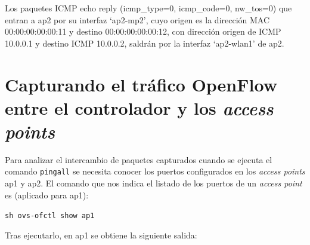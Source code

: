 \documentclass[a4paper,12pt,twoside,spanish]{book}
\begin{document}
Los paquetes ICMP echo reply (icmp\_type=0, icmp\_code=0, nw\_tos=0) que entran a ap2 por su interfaz ‘ap2-mp2’, cuyo origen es la dirección MAC 00:00:00:00:00:11 y destino 00:00:00:00:00:12, con dirección origen de ICMP 10.0.0.1 y destino ICMP 10.0.0.2, saldrán por la interfaz ‘ap2-wlan1’ de ap2.\par 







\section{Capturando el tráfico OpenFlow entre el controlador y los \textit{access points}}\label{sect:capt_of}

Para analizar el intercambio de paquetes capturados cuando se ejecuta el comando \texttt{pingall} se necesita conocer los puertos configurados en los \textit{access points} ap1 y ap2. El comando que nos indica el listado de los puertos de un \textit{access point} es (aplicado para ap1):\par 

\begin{center}
	\texttt{sh ovs-ofctl show ap1}
\end{center}

Tras ejecutarlo, en ap1 se obtiene la siguiente salida:
\end{document}
